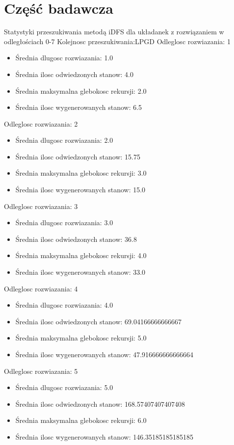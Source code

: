 \documentclass{classrep}
\begin{document}
		\section{Część badawcza}
		Statystyki przeszukiwania metodą iDFS dla układanek z rozwiązaniem w odległościach 0-7
		\newline
		Kolejnosc przeszukiwania:LPGD
		Odleglosc rozwiazania: 1
		\begin{itemize}
		\item Średnia dlugosc rozwiazania: 1.0
		\item Średnia ilosc odwiedzonych stanow: 4.0
		\item Średnia maksymalna glebokosc rekursji: 2.0
		\item Średnia ilosc wygenerowanych stanow: 6.5
		\end{itemize}
		Odleglosc rozwiazania: 2
		\begin{itemize}
		\item Średnia dlugosc rozwiazania: 2.0
		\item Średnia ilosc odwiedzonych stanow: 15.75
		\item Średnia maksymalna glebokosc rekursji: 3.0
		\item Średnia ilosc wygenerowanych stanow: 15.0
		\end{itemize}
		Odleglosc rozwiazania: 3
		\begin{itemize}
		\item Średnia dlugosc rozwiazania: 3.0
		\item Średnia ilosc odwiedzonych stanow: 36.8
		\item Średnia maksymalna glebokosc rekursji: 4.0
		\item Średnia ilosc wygenerowanych stanow: 33.0
		\end{itemize}
		Odleglosc rozwiazania: 4
		\begin{itemize}
		\item Średnia dlugosc rozwiazania: 4.0
		\item Średnia ilosc odwiedzonych stanow: 69.04166666666667
		\item Średnia maksymalna glebokosc rekursji: 5.0
		\item Średnia ilosc wygenerowanych stanow: 47.916666666666664
		\end{itemize}
		Odleglosc rozwiazania: 5
		\begin{itemize}
		\item Średnia dlugosc rozwiazania: 5.0
		\item Średnia ilosc odwiedzonych stanow: 168.57407407407408
		\item Średnia maksymalna glebokosc rekursji: 6.0
		\item Średnia ilosc wygenerowanych stanow: 146.35185185185185
		\end{itemize}
\end{document}
